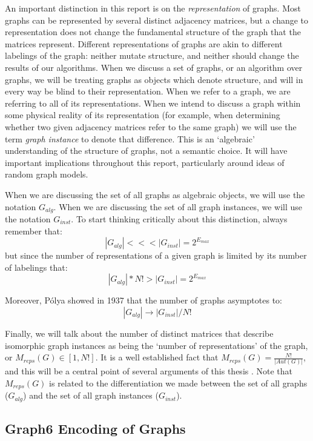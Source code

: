 An important distinction in this report is on the \emph{representation} of graphs.
Most graphs can be represented by several distinct adjacency matrices, but a change to representation does not change the fundamental structure of the graph that the matrices represent.
Different representations of graphs are akin to different labelings of the graph: neither mutate structure, and neither should change the results of our algorithms.
When we discuss a set of graphs, or an algorithm over graphs, we will be treating graphs as objects which denote structure, and will in every way be blind to their representation.
When we refer to a graph, we are referring to all of its representations.
When we intend to discuss a graph within some physical reality of its representation (for example, when determining whether two given adjacency matrices refer to the same graph) we will use the term \emph{graph instance} to denote that difference.
This is an `algebraic' understanding of the structure of graphs, not a semantic choice. 
It will have important implications throughout this report, particularly around ideas of random graph models.

When we are discussing the set of all graphs as algebraic objects, we will use the notation $G_{alg}$.
When we are discussing the set of all graph instances, we will use the notation $G_{inst}$.
To start thinking critically about this distinction, always remember that:
$$|G_{alg}| <<< |G_{inst}| = 2^{E_{max}}$$
but since the number of representations of a given graph is limited by its number of labelings that:
$$|G_{alg}| * N! > | G_{inst} | =  2^{E_{max}}$$

Moreover, P\'olya showed in 1937 \cite{polya} that the number of graphs asymptotes to:
$$|G_{alg}| \rightarrow |G_{inst}| / N!$$

Finally, we will talk about the number of distinct matrices that describe isomorphic graph instances as being the `number of representations' of the graph, or $M_{reps}(G) \in [1, N!]$.
It is a well established fact that $M_{reps}(G) = \frac{N!}{ | Aut(G) |}$, and this will be a central point of several arguments of this thesis \cite{adjmat}.
Note that  $M_{reps}(G)$ is related to the differentiation we made between the set of all graphs ($G_{alg}$) and the set of all graph instances ($G_{inst}$).

\subsection{Graph6 Encoding of Graphs}
\label{section:graph6}

